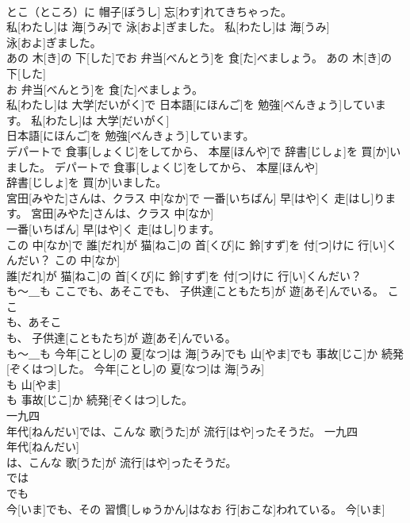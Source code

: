 \documentclass[8pt]{extreport}
\begin{document}
\begin{CJK}{UTF8}{min}
\\	とこ（ところ）に 帽子[ぼうし] 忘[わす]れてきちゃった。	
\\	私[わたし]は 海[うみ]で 泳[およ]ぎました。	私[わたし]は 海[うみ]
\\	泳[およ]ぎました。	
\\	あの 木[き]の 下[した]でお 弁当[べんとう]を 食[た]べましょう。	あの 木[き]の 下[した]
\\	お 弁当[べんとう]を 食[た]べましょう。	
\\	私[わたし]は 大学[だいがく]で 日本語[にほんご]を 勉強[べんきょう]しています。	私[わたし]は 大学[だいがく]
\\	日本語[にほんご]を 勉強[べんきょう]しています。	
\\	デパートで 食事[しょくじ]をしてから、 本屋[ほんや]で 辞書[じしょ]を 買[か]いました。	デパートで 食事[しょくじ]をしてから、 本屋[ほんや]
\\	辞書[じしょ]を 買[か]いました。	
\\	宮田[みやた]さんは、クラス 中[なか]で 一番[いちばん] 早[はや]く 走[はし]ります。	宮田[みやた]さんは、クラス 中[なか]
\\	一番[いちばん] 早[はや]く 走[はし]ります。	
\\	この 中[なか]で 誰[だれ]が 猫[ねこ]の 首[くび]に 鈴[すず]を 付[つ]けに 行[い]くんだい？	この 中[なか]
\\	誰[だれ]が 猫[ねこ]の 首[くび]に 鈴[すず]を 付[つ]けに 行[い]くんだい？	
\\	も～＿も	ここでも、あそこでも、 子供達[こともたち]が 遊[あそ]んでいる。	ここ
\\	も、あそこ
\\	も、 子供達[こともたち]が 遊[あそ]んでいる。	
\\	も～＿も	今年[ことし]の 夏[なつ]は 海[うみ]でも 山[やま]でも 事故[じこ]か 続発[ぞくはつ]した。	今年[ことし]の 夏[なつ]は 海[うみ]
\\	も 山[やま]
\\	も 事故[じこ]か 続発[ぞくはつ]した。	
\\	一九四
\\	[せんきゅうひゃくよんじゅう] 年代[ねんだい]では、こんな 歌[うた]が 流行[はや]ったそうだ。	一九四
\\	[せんきゅうひゃくよんじゅう] 年代[ねんだい]
\\	は、こんな 歌[うた]が 流行[はや]ったそうだ。	
\\	では 
\\	でも 
\\	今[いま]でも、その 習慣[しゅうかん]はなお 行[おこな]われている。	今[いま]

\end{CJK}
\end{document}
